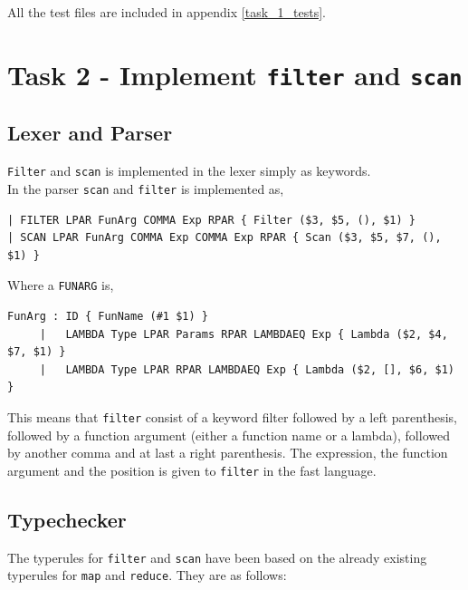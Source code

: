 \documentclass[11pt]{article}
\begin{document}
    All the test files are included in appendix \ref{task_1_tests}.

    \section{Task 2 - Implement \texttt{filter} and \texttt{scan}}
    \subsection{Lexer and Parser}
    \texttt{Filter} and \texttt{scan} is implemented in the lexer simply as
    keywords.\\

    In the parser \texttt{scan} and \texttt{filter} is implemented as,

    \begin{lstlisting}[basicstyle=\small]
| FILTER LPAR FunArg COMMA Exp RPAR { Filter ($3, $5, (), $1) }
| SCAN LPAR FunArg COMMA Exp COMMA Exp RPAR { Scan ($3, $5, $7, (), $1) }
    \end{lstlisting}

    Where a \texttt{FUNARG} is,

    \begin{lstlisting}[basicstyle=\small]
FunArg : ID { FunName (#1 $1) }
     |   LAMBDA Type LPAR Params RPAR LAMBDAEQ Exp { Lambda ($2, $4, $7, $1) }
     |   LAMBDA Type LPAR RPAR LAMBDAEQ Exp { Lambda ($2, [], $6, $1) }
    \end{lstlisting}

    This means that \texttt{filter} consist of a keyword filter followed by a
    left parenthesis, followed by a function argument (either a function name or
    a lambda), followed by another comma and at last a right parenthesis.  The
    expression, the function argument and the position is given to
    \texttt{filter} in the fast language.

    \subsection{Typechecker}
    The typerules for \texttt{filter} and \texttt{scan} have been based on the
    already existing typerules for \texttt{map} and \texttt{reduce}. They are as
    follows: \\
\end{document}
